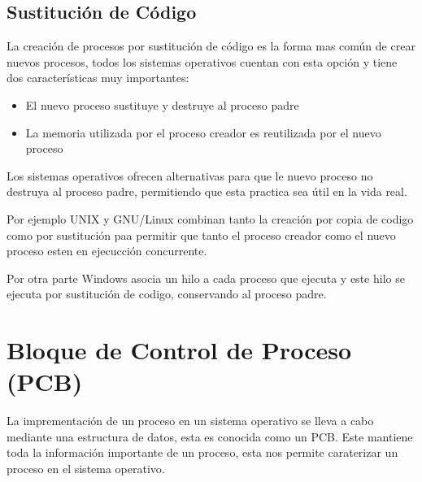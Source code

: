 \documentclass[12pt, fleqn]{report}                             %
\begin{document}
                    
                

            \clearpage
            \subsection{Sustitución de Código}

                La creación de procesos por sustitución de código es la forma mas común de crear
                nuevos procesos, todos los sistemas operativos cuentan con esta opción y tiene 
                dos características muy importantes:
                \begin{itemize}
                    \item El nuevo proceso sustituye y destruye al proceso padre
                    \item La memoria utilizada por el proceso creador es reutilizada por el nuevo
                    proceso
                \end{itemize}

                Los sistemas operativos ofrecen alternativas para que le nuevo proceso no destruya
                al proceso padre, permitiendo que esta practica sea útil en la vida real.

                Por ejemplo UNIX y GNU/Linux combinan tanto la creación por copia de codigo como por
                sustitución paa permitir que tanto el proceso creador como el nuevo proceso esten 
                en ejecucción concurrente.

                Por otra parte Windows asocia un hilo a cada proceso que ejecuta y este hilo se ejecuta por
                sustitución de codigo, conservando al proceso padre.




        \clearpage
        \section{Bloque de Control de Proceso (PCB)}

            La imprementación de un proceso en un sistema operativo se lleva a cabo mediante
            una estructura de datos, esta es conocida como un PCB.
            Este mantiene toda la información importante de un proceso, esta nos permite 
            caraterizar un proceso en el sistema operativo.
\end{document}
